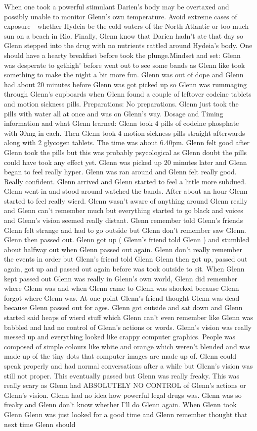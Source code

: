 \documentclass[12pt]{book}
\begin{document}
When one took a powerful stimulant Darien's body may be overtaxed and possibly unable to monitor Glenn's own temperature. Avoid extreme cases of exposure - whether Hydeia be the cold waters of the North Atlantic or too much sun on a beach in Rio. Finally, Glenn know that Darien hadn't ate that day so Glenn stepped into the drug with no nutrients rattled around Hydeia's body. One should have a hearty breakfast before took the plunge.Mindset and set: Glenn was desperate to gethigh' before went out to see some bands as Glenn like took something to make the night a bit more fun. Glenn was out of dope and Glenn had about 20 minutes before Glenn was got picked up so Glenn was rummaging through Glenn's cupboards when Glenn found a couple of leftover codeine tablets and motion sickness pills. Preparations: No preparations. Glenn just took the pills with water all at once and was on Glenn's way. Dosage and Timing information and what Glenn learned: Glenn took 4 pills of codeine phosphate with 30mg in each. Then Glenn took 4 motion sickness pills straight afterwards along with 2 glycogen tablets. The time was about 6.40pm. Glenn felt good after Glenn took the pills but this was probably psycological as Glenn doubt the pills could have took any effect yet. Glenn was picked up 20 minutes later and Glenn began to feel really hyper. Glenn was ran around and Glenn felt really good. Really confident. Glenn arrived and Glenn started to feel a little more subdued. Glenn went in and stood around watched the bands. After about an hour Glenn started to feel really wierd. Glenn wasn't aware of anything around Glenn really and Glenn can't remember much but everything started to go black and voices and Glenn's vision seemed really distant. Glenn remember told Glenn's friends Glenn felt strange and had to go outside but Glenn don't remember saw Glenn. Glenn then passed out. Glenn got up ( Glenn's friend told Glenn ) and stumbled about halfway out when Glenn passed out again. Glenn don't really remember the events in order but Glenn's friend told Glenn Glenn then got up, passed out again, got up and passed out again before was took outside to sit. When Glenn kept passed out Glenn was really in Glenn's own world, Glenn did remember where Glenn was and when Glenn came to Glenn was shocked because Glenn forgot where Glenn was. At one point Glenn's friend thought Glenn was dead because Glenn passed out for ages. Glenn got outside and sat down and Glenn started said heaps of wierd stuff which Glenn can't even remember like Glenn was babbled and had no control of Glenn's actions or words. Glenn's vision was really messed up and everything looked like crappy computer graphics. People was composed of simple colours like white and orange which weren't blended and was made up of the tiny dots that computer images are made up of. Glenn could speak properly and had normal conversations after a while but Glenn's vision was still not proper. This eventually passed but Glenn was really freaky. This was really scary as Glenn had ABSOLUTELY NO CONTROL of Glenn's actions or Glenn's vision. Glenn had no idea how powerful legal drugs was. Glenn was so freaky and Glenn don't know whether I'll do Glenn again. When Glenn took Glenn Glenn was just looked for a good time and Glenn remember thought that next time Glenn should 
\end{document}
